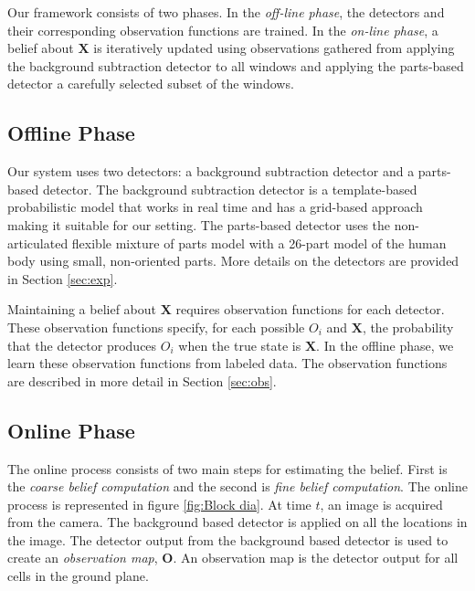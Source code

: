\documentclass[10pt,twocolumn,letterpaper]{article}
\begin{document}
Our framework consists of two phases.   In the \emph{off-line phase}, the detectors and their corresponding observation functions are trained.  In the \emph{on-line phase}, a belief about $\mathbf{X}$ is iteratively updated using observations gathered from applying the background subtraction detector to all windows and applying the parts-based detector a carefully selected subset of the windows.

\subsection{Offline Phase}
 
Our system uses two detectors: a background subtraction detector and a parts-based detector.  The background subtraction detector is a template-based probabilistic model \cite{englebienneFast}  that works in real time and has a grid-based approach making it suitable for our setting.  The parts-based detector uses the non-articulated flexible mixture of parts model \cite{partsDeva} with a 26-part model of the human body using small, non-oriented parts.
More details on the detectors are provided in Section \ref{sec:exp}.

Maintaining a belief about $\mathbf{X}$ requires observation functions for each detector.  These observation functions specify, for each possible $O_i$ and $\mathbf{X}$, the probability that the detector produces $O_i$ when the true state is $\mathbf{X}$.  In the offline phase, we learn these observation functions from labeled data.  The observation functions are described in more detail in Section \ref{sec:obs}.

\subsection{Online Phase}
The online process consists of two main steps for estimating the belief. First is the \textit{coarse belief computation} and the second is \textit{fine belief computation}. The online process is represented in figure \ref{fig:Block dia}.
At time $t $, an image is acquired from the camera. The background based detector is applied on all the locations in the image. The detector output from the background based detector is used to create an \textit{observation map}, $\textbf{O}$. An observation map is the detector output for all cells in the ground plane.  
\end{document}
